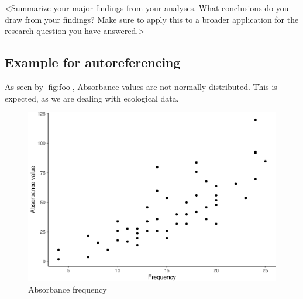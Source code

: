 \documentclass[12pt,]{article}
\begin{document}
\textless{}Summarize your major findings from your analyses. What
conclusions do you draw from your findings? Make sure to apply this to a
broader application for the research question you have
answered.\textgreater{}

\hypertarget{example-for-autoreferencing}{%
\subsection{Example for
autoreferencing}\label{example-for-autoreferencing}}

As seen by \autoref{fig:foo}, Absorbance values are not normally
distributed. This is expected, as we are dealing with ecological data.

\begin{figure}
\centering
\includegraphics{Project_Template_files/figure-latex/foo-1.pdf}
\caption{\label{fig:foo}Absorbance frequency}
\end{figure}
\end{document}
